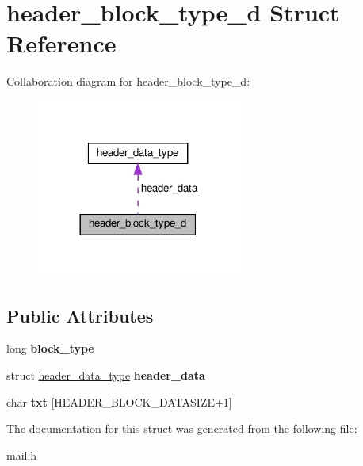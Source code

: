 \hypertarget{structheader__block__type__d}{}\section{header\+\_\+block\+\_\+type\+\_\+d Struct Reference}
\label{structheader__block__type__d}


Collaboration diagram for header\+\_\+block\+\_\+type\+\_\+d\+:\nopagebreak
\begin{figure}[H]
\begin{center}
\leavevmode
\includegraphics[width=192pt]{structheader__block__type__d__coll__graph}
\end{center}
\end{figure}
\subsection*{Public Attributes}
\begin{DoxyCompactItemize}
\item 
\mbox{\label{structheader__block__type__d_ad6787a83675f7e68a6d29f6931d6c5ce}} 
long {\bfseries block\+\_\+type}
\item 
\mbox{\label{structheader__block__type__d_ac0db232ae99789e82a3b88798004c6d4}} 
struct \hyperlink{structheader__data__type}{header\+\_\+data\+\_\+type} {\bfseries header\+\_\+data}
\item 
\mbox{\label{structheader__block__type__d_adc6292227479941dc7e6dd2f72a30f13}} 
char {\bfseries txt} \mbox{[}H\+E\+A\+D\+E\+R\+\_\+\+B\+L\+O\+C\+K\+\_\+\+D\+A\+T\+A\+S\+I\+ZE+1\mbox{]}
\end{DoxyCompactItemize}


The documentation for this struct was generated from the following file\+:\begin{DoxyCompactItemize}
\item 
mail.\+h\end{DoxyCompactItemize}
